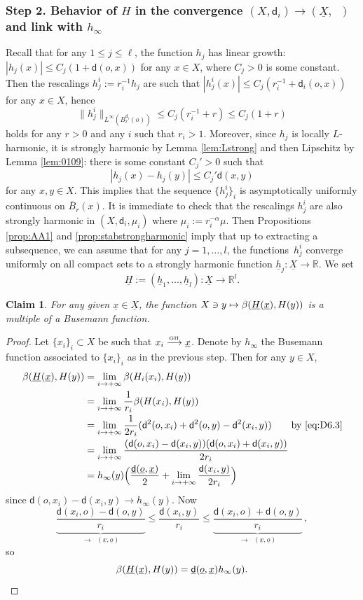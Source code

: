 \documentclass[10pt]{amsart}
\newcommand\mto{\mathchoice{\longmapsto}{\mapsto}{\mapsto}{\mapsto}}
\def\To#1{\mathchoice{\xrightarrow{\textstyle\kern4pt#1\kern3pt}}{\stackrel{#1}{\longrightarrow}}{}{}}
\newcommand{\sGH}{{\scriptscriptstyle\mathrm{GH}\,}}
\theoremstyle{plain}
\newtheorem{claim}[theorem]{Claim}
\theoremstyle{definition}
\newcommand{\setR}{\mathbb{R}}
\newcommand{\dist}{\mathsf{d}}
\newcommand{\uX}{\underline{X}}
\DeclareMathOperator{\udist}{\underline{\dist}}
\newcommand{\uo}{\underline{o}}
\newcommand{\ux}{\underline{x}}
\newcommand{\uH}{\underline{H}}
\newcommand{\uh}{\underline{h}}
\begin{document}
\subsubsection*{Step 2. Behavior of $H$ in the convergence $(X,\dist_i) \to (\uX,\udist)$ and link with $h_\infty$}

Recall that for any $1 \le j \le \ell$, the function $h_j$ has linear growth: $|h_j(x)| \le C_j (1+\dist(o,x))$ for any $x \in X$, where $C_j>0$ is some constant. Then the rescalings $h_j^{i}:=r_i^{-1}h_j$ are such that $|h_j^{i}(x)| \le C_j(r_i^{-1}+ \dist_i(o,x))$ for any $x \in X$, hence
\[
\|h_j^{i}\|_{L^\infty(B_r^{\dist_i}(o))} \le C_j(r_i^{-1}+r)\le C_j(1+r)
\]
holds for any $r>0$ and any $i$ such that $r_i>1$. Moreover, since $h_j$ is locally $L$-harmonic, it is strongly harmonic by Lemma \ref{lem:Lstrong} and then Lipschitz by Lemma \ref{lem:0109}: there is some constant $C_j'>0$ such that
\[
|h_j(x)-h_j(y)|\le C_j' \dist(x,y)
\]
for any $x,y \in X$. This implies that the sequence $\{h_j^{i}\}_i$ is asymptotically uniformly continuous on $\overline{B}_r(x)$. It is immediate to check that the rescalings $h_j^{i}$ are also strongly harmonic in $(X,\dist_i,\mu_i)$ where $\mu_i:=r_i^{-\alpha}\mu$. Then Propositions \ref{prop:AA1} and \ref{prop:stabstrongharmonic} imply that up to extracting a subsequence, we can assume that for any $j=1,\dots, l$, the functions~$h_j^{i}$ converge uniformly on all compact sets to a strongly harmonic function $\uh_j: \uX \to \setR$. We set
\[
\uH:= (\uh_1,\ldots,\uh_l): \uX \to \setR^l.
\]

\begin{claim}
For any given $\ux \in \uX$, the function $X \ni y \mto \beta(\uH(\ux),H(y))$ is a multiple of a Busemann function.
\end{claim}

\begin{proof}
Let $\{x_i\}_i \subset X$ be such that $x_i \To{\sGH} \ux$. Denote by $h_\infty$ the Busemann function associated to $\{x_i\}_i$ as in the previous step. Then for any $y \in X$,
\begin{align*}
\beta(\uH(\ux),H(y)) & = \lim_{i \to +\infty} \beta(H_i(x_i),H(y))\\ & = \lim_{i \to +\infty} \frac{1}{r_i} \beta(H(x_i),H(y))\\[-1pt]
& = \lim_{i \to +\infty} \frac{1}{2r_i} (\dist^2(o,x_i)+\dist^2(o,y)-\dist^2(x_i,y)) \qquad \text{by \eqref{eq:D6.3}}\\[-1pt]
& = \lim_{i \to +\infty} \frac{(\dist(o,x_i)-\dist(x_i,y))(\dist(o,x_i)+\dist(x_i,y))}{2r_i}\\[-1pt]
& = h_\infty(y) \Bigl(\frac{\udist(\uo,\ux)}{2} + \lim_{i \to +\infty} \frac{\dist(x_i,y)}{2r_i} \Bigr)
\end{align*}
since $\dist(o,x_i)-\dist(x_i,y) \to h_\infty(y)$. Now
\[
\underbrace{\frac{\dist(x_i,o)-\dist(o,y)}{r_i}}_{\to \udist(\ux,\uo)} \le \frac{\dist(x_i,y)}{r_i} \le \underbrace{\frac{\dist(x_i,o)+\dist(o,y)}{r_i}}_{\to \udist(\ux,\uo)}\,,
\]
so\vspace*{-4pt}
\begin{equation}
\beta(\uH(\ux),H(y)) = \udist(\uo,\ux) h_\infty(y).\qedhere
\end{equation}
\end{proof}
\end{document}
